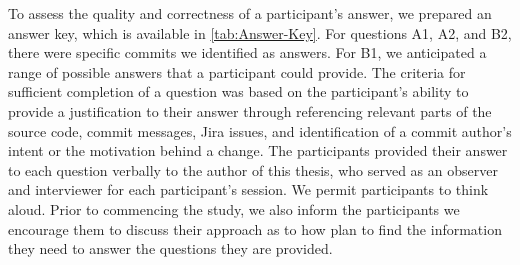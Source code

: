 To assess the quality and correctness of a participant's answer, 
we prepared an answer key, which is available in \autoref{tab:Answer-Key}.
For questions A1, A2, and B2, there were specific commits we identified as answers.
For B1, we anticipated a range of possible answers that a participant could provide.
The criteria for sufficient completion of a question was based on the participant's ability to provide a justification to their answer through referencing relevant parts of the source code, commit messages, Jira issues, and
identification of a commit author's intent or the motivation behind a change.
The participants provided their answer to each question verbally to the author of this thesis, 
who served as an observer and interviewer for each participant's session.
We permit participants to think aloud.
Prior to commencing the study, we also inform the participants we encourage them to discuss their approach 
as to how plan to find the information they need to answer the questions they are provided.


